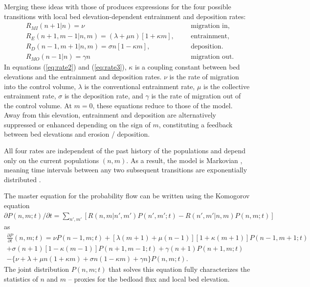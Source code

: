 Merging these ideas with those of \citet{Ancey2008} produces expressions for the four possible transitions with local bed elevation-dependent entrainment and deposition rates:
\begin{align}
	&R_{MI}(n+1|n) = \nu && &\text{migration in}, \label{eq:rate1}\\
	&R_E(n+1,m-1|n,m)=(\lambda + \mu n)[1 + \kappa m], && &\text{entrainment}, \label{eq:rate2}\\
	&R_D(n-1,m+1|n,m)=\sigma n [1- \kappa m ], && &\text{deposition}. \label{eq:rate3} \\
	&R_{MO}(n-1|n) =\gamma n && &\text{migration out} \label{eq:rate4}.
\end{align}
In equations (\ref{eq:rate2}) and (\ref{eq:rate3}), $\kappa$ is a coupling constant between bed elevations and the entrainment and deposition rates.
$\nu$ is the rate of migration into the control volume, $\lambda$ is the conventional entrainment rate, $\mu$ is the collective entrainment rate, $\sigma$ is the deposition rate, and $\gamma$ is the rate of migration out of the control volume.
At $m=0$, these equations reduce to those of the \citet{Ancey2008} model.
Away from this elevation, entrainment and deposition are alternatively suppressed or enhanced depending on the sign of $m$, constituting a feedback between bed elevations and erosion / deposition.

All four rates are independent of the past history of the populations and depend only on the current populations $(n,m)$. 
As a result, the model is Markovian \citep{Cox1965, VanKampen2007}, meaning time intervals between any two subsequent transitions are exponentially distributed \citep{Gillespie2007}.

The master equation for the probability flow can be written using the Komogorov equation
 $\partial P(n,m;t)/\partial t = 
\sum_{n',m'} [R(n,m|n',m')P(n',m';t)-R(n',m'|n,m)P(n,m;t)]$ \citep{Cox1965, Gillespie1991, Ancey2008} as 
\begin{multline}
	\frac{\partial P}{\partial t}(n,m;t) =  
	\nu P(n-1,m;t) + [\lambda(m+1) + \mu(n-1)][1+\kappa(m+1)]P(n-1,m+1;t)\\  
	+ \sigma(n+1)[1-\kappa(m-1)]P(n+1,m-1;t) + \gamma(n+1) P(n+1,m;t) \\
	- 
	\{ \nu + \lambda+ \mu n (1+\kappa m) +  \sigma n ( 1- \kappa m) + \gamma n \}P(n,m;t).
	\label{eq:elemaster}
\end{multline}
The joint distribution $P(n,m;t)$ that solves this equation fully characterizes the statistics of $n$ and $m$ -- proxies for the bedload flux and local bed elevation.

